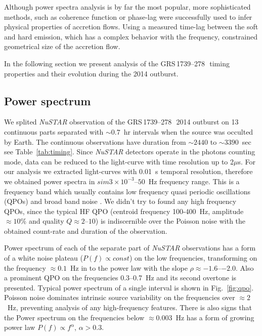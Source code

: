 \documentclass[a4paper,fleqn,usenatbib]{mnras}
\def\grs{{GRS\,1739--278\,}}
\begin{document}
Although power spectra analysis is by far the most popular, more sophisticated methods, such as coherence function or phase-lag were successfully used to infer physical properties of accretion flows. 
Using a measured time-lag between the soft and hard emission, which has a complex behavior with the frequency, \cite{1999ApJ...517..355N} constrained geometrical size of the accretion flow. 


In the following section we present analysis of the \grs\ timing properties and their evolution during the 2014 outburst.

\subsection{Power spectrum}

We splited {\it NuSTAR} observation of the \grs\ 2014 outburst on 13 continuous parts separated with $\sim0.7$~hr intervals when the source was occulted by Earth. 
The continuous observations have duration from $\sim2440$ to $\sim3390$~sec see Table~\ref{tab:timing}.
Since {\it NuSTAR} detectors operate in the photons counting mode, data can be reduced to the light-curve with time resolution up to 2$\mu$s.
For our analysis we extracted light-curves with 0.01~s temporal resolution, therefore we obtained power spectra in $sim3\times10^{-3}$--$50$~Hz frequency range.
This is a frequency band which usually contains low frequency quasi periodic oscillations (QPOs) and broad band noise \citep{1999ApJ...514..939W}.
We didn't try to found any high frequency QPOs, since the typical HF QPO (centroid frequency 100-400~Hz, amplitude $\approx10$\% and quality $Q\approx2$--$10$) is indiscernible over the Poisson noise with the obtained count-rate and duration of the observation.

Power spectrum of each of the separate part of {\it NuSTAR} observations has a form of a white noise plateau ($P(f)\propto const$) on the low frequencies, transforming on the frequency $\approx0.1$~Hz in to the power law with the slope $\rho\approx-1.6$--$-2.0$. 
Also a prominent QPO on the frequencies 0.3--0.7~Hz and its second overtone is presented. 
Typical power spectrum of a single interval is shown in Fig.~\ref{fig:qpo}.
Poisson noise dominates intrinsic source variability on the frequencies over $\approx2$~Hz, preventing analysis of any high-frequency features.
There is also signs that the Power spectrum on the frequencies below $\approx0.003$~Hz has a form of growing power law $P(f)\propto f^{\alpha}$, $\alpha > 0.3$.
\end{document}
